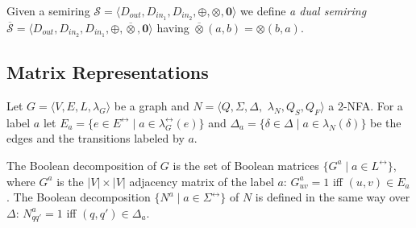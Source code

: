 Given a semiring $\mathcal{S} = \langle D_{out}, D_{in_1}, D_{in_2}, \oplus, \otimes, \mathbf{0} \rangle$ we define \emph{a dual semiring} $\overline{\mathcal{S}} = \langle D_{out}, D_{in_2}, D_{in_1}, \oplus, \overline{\otimes}, \mathbf{0} \rangle$ having $\overline{\otimes}(a, b) = \otimes(b, a)$.



\subsection{Matrix Representations}

Let $G = \langle V, E, L, \lambda_G \rangle$ be a graph and $N = \langle Q, \Sigma, \Delta,$ $\lambda_N, Q_S, Q_F \rangle$ a 2-NFA.
For a label $a$ let $E_a = \{ e \in E^\leftrightarrow \mid a \in \lambda_G^\leftrightarrow(e) \}$ and $\Delta_a = \{ \delta \in \Delta \mid a \in \lambda_N(\delta) \}$ be the edges and the transitions labeled by $a$.

\begin{definition}
	The Boolean decomposition of $G$ is the set of Boolean matrices $\{ G^a \mid a \in L^\leftrightarrow \}$, where $G^a$ is the $|V| \times |V|$ adjacency matrix of the label $a$: $G^a_{uv} = 1$ iff $(u, v) \in E_a$.
	The Boolean decomposition $\{ N^a \mid a \in \Sigma^\leftrightarrow \}$ of $N$ is defined in the same way over $\Delta$: $N^a_{qq'} = 1$ iff $(q, q') \in \Delta_a$.
\end{definition}
%
%
%


